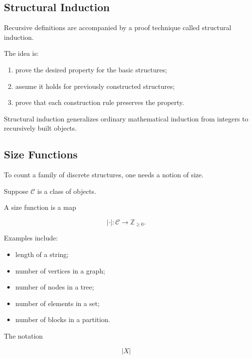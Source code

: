 \subsection{Structural Induction}
\label{subsec:structural-induction}

Recursive definitions are accompanied by a proof technique called
structural induction.

The idea is:

\begin{enumerate}
    \item prove the desired property for the basic structures;
    \item assume it holds for previously constructed structures;
    \item prove that each construction rule preserves the property.
\end{enumerate}

Structural induction generalizes ordinary mathematical induction from
integers to recursively built objects.

\subsection{Size Functions}
\label{subsec:size-functions}

To count a family of discrete structures, one needs a notion of size.

Suppose \(\mathcal{C}\) is a class of objects.

A size function is a map

\[
\boxed{
|\cdot|:\mathcal{C}\to\mathbb{Z}_{\geq0}.
}
\]

Examples include:

\begin{itemize}
    \item length of a string;
    \item number of vertices in a graph;
    \item number of nodes in a tree;
    \item number of elements in a set;
    \item number of blocks in a partition.
\end{itemize}

The notation

\[
|X|
\]

